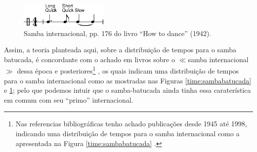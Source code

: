 \begin{itemize}
\parbox[t]{\dimexpr\textwidth-\leftmargin}
{%
\begin{figure}
  \vspace{-10pt}
  \includegraphics[width=0.38\textwidth]{chapters/cap-historia-sambagafieira/samba-internacional-timming.eps}
  \caption{Samba internacional, pp. 176 do livro ``How to dance'' (1942).}
  \vspace{-10pt}
  \label{timming:samba-internacional:a}
\end{figure}
Assim, a teoria planteada aqui, sobre a distribuição de tempos para o samba batucada, 
é concordante com o achado em livros sobre o $\ll$samba internacional$\gg$  
dessa época e posteriores\footnote{Nas referencias bibliográficas tenho achado publicações desde 1945 até 1998,
indicando uma distribuição de tempos para o samba internacional como a apresentada na Figura \ref{time:sambabatucada}
\cite[pp. 7,176]{wright1945dance} \cite[pp. 193]{white1953dancing} \cite[pp. 69]{stephenson1992complete} \cite[pp. 125]{harris1998social}.}
\cite[pp. 7,176]{wright1945dance} \cite[pp. 193]{white1953dancing} \cite[pp. 69]{stephenson1992complete} \cite[pp. 125]{harris1998social},
os quais indicam uma distribuição de tempos para o samba internacional como as mostradas nas Figuras \ref{time:sambabatucada} e \ref{timming:samba-internacional:a};
pelo que podemos intuir que o samba-batucada ainda tinha essa caraterística em comum com seu ``primo'' internacional.
}

\end{itemize}
